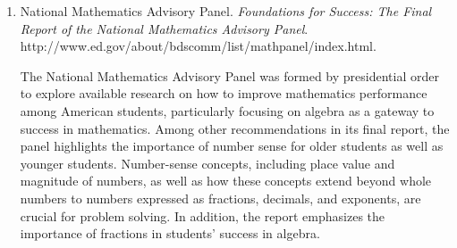 {{\begin{enumerate}
          \par\noindent\hspace*{1em} This review of research on mathematical estimation and number sense discusses three related areas: computational estimation, measurement estimation, and number sense. The chapter makes a case for the importance of both school-aged children's and adults' being able to estimate in both in-school and out-of-school contexts. Posessing a deep understanding of number, including understanding magnitude and numerical comparisons, and being about to reason about number are vital to being a good estimator.\vspace{.35\baselineskip}

        \item National Mathematics Advisory Panel. \emph{Foundations for Success: The Final Report of the National Mathematics Advisory Panel}. http://www.ed.gov/about/bdscomm/list/mathpanel/index.html.\vspace{.25\baselineskip}

          \par\noindent\hspace*{1em} The National Mathematics Advisory Panel was formed by presidential order to explore available research on how to improve mathematics performance among American students, particularly focusing on algebra as a gateway to success in mathematics. Among other recommendations in its final report, the panel highlights the importance of number sense for older students as well as younger students. Number-sense concepts, including place value and magnitude of numbers, as well as how these concepts extend beyond whole numbers to numbers expressed as fractions, decimals, and exponents, are crucial for problem solving. In addition, the report emphasizes the importance of fractions in students' success in algebra.
      \end{enumerate}}
  }
